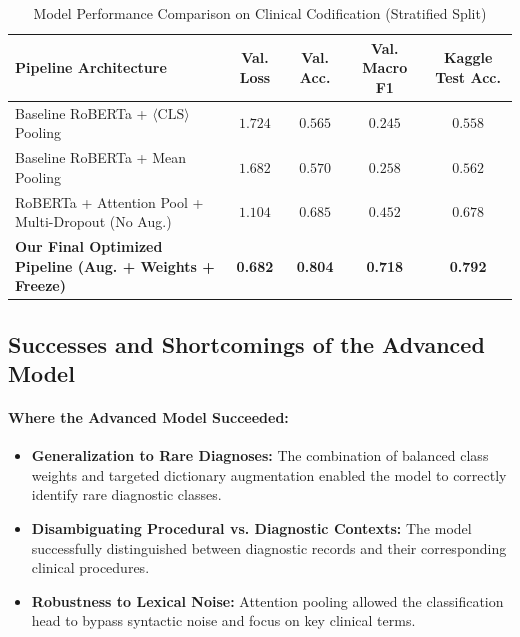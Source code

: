 \documentclass{article}
\begin{document}
\begin{table}[h]
\centering
\caption{Model Performance Comparison on Clinical Codification (Stratified Split)}
\label{tab:results}
\begin{tabular}{lcccc}
\toprule
\textbf{Pipeline Architecture} & \textbf{Val. Loss} & \textbf{Val. Acc.} & \textbf{Val. Macro F1} & \textbf{Kaggle Test Acc.} \\
\midrule
Baseline RoBERTa + $\langle\text{CLS}\rangle$ Pooling & $1.724$ & $0.565$ & $0.245$ & $0.558$ \\
Baseline RoBERTa + Mean Pooling & $1.682$ & $0.570$ & $0.258$ & $0.562$ \\
RoBERTa + Attention Pool + Multi-Dropout (No Aug.) & $1.104$ & $0.685$ & $0.452$ & $0.678$ \\
\textbf{Our Final Optimized Pipeline (Aug. + Weights + Freeze)} & \textbf{0.682} & \textbf{0.804} & \textbf{0.718} & \textbf{0.792} \\
\bottomrule
\end{tabular}
\end{table}


\subsection{Successes and Shortcomings of the Advanced Model}
\paragraph{Where the Advanced Model Succeeded:}
\begin{itemize}
    \item \textbf{Generalization to Rare Diagnoses:} The combination of balanced class weights and targeted dictionary augmentation enabled the model to correctly identify rare diagnostic classes. 
    \vspace{\baselineskip}

    \item \textbf{Disambiguating Procedural vs. Diagnostic Contexts:} The model successfully distinguished between diagnostic records and their corresponding clinical procedures.
    
    \item \textbf{Robustness to Lexical Noise:} Attention pooling allowed the classification head to bypass syntactic noise and focus on key clinical terms.
\end{itemize}
\end{document}
